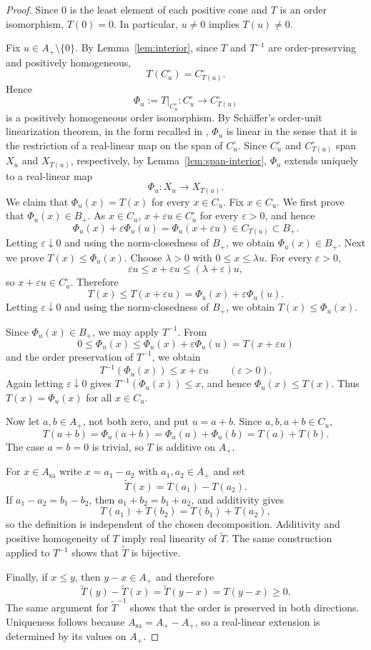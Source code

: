\documentclass[10pt,a4paper]{amsart}
\newcommand{\sa}{\mathrm{sa}}
\begin{document}
\begin{proof}
Since $0$ is the least element of each positive cone and $T$ is an
order isomorphism, $T(0)=0$.  In particular, $u\ne0$ implies
$T(u)\ne0$.

Fix $u\in A_+\setminus\{0\}$.  By Lemma~\ref{lem:interior}, since $T$ and $T^{-1}$ are 
order-preserving and positively homogeneous, 
\[
 T(C_u^\circ)=C_{T(u)}^\circ.
\]
Hence
\[
 \Phi_u:=T|_{C_u^\circ}:C_u^\circ\longrightarrow C_{T(u)}^\circ
\]
is a positively homogeneous order isomorphism.  By Sch\"affer's
order-unit linearization theorem, in the form recalled in
\cite[Theorem~5.2]{LGI}, $\Phi_u$ is linear in the sense that it is the
restriction of a real-linear map on the span of $C_u^\circ$.  Since
$C_u^\circ$ and $C_{T(u)}^\circ$ span $X_u$ and $X_{T(u)}$, respectively,
by Lemma~\ref{lem:span-interior}, $\Phi_u$ extends uniquely to a
real-linear map
\[
 \Phi_u:X_u\longrightarrow X_{T(u)}.
\]
We claim that $\Phi_u(x)=T(x)$ for every $x\in C_u$.  
Fix $x\in C_u$.  We first prove that $\Phi_u(x)\in B_+$. As $x\in C_u$, $x+\varepsilon u\in C_u^\circ$ for every $\varepsilon>0$, and hence
\[
        \Phi_u(x)+\varepsilon\Phi_u(u)
        =\Phi_u(x+\varepsilon u)\in C_{T(u)}\subset B_+.
\]
Letting $\varepsilon\downarrow0$ and using the norm-closedness of $B_{+}$, we obtain $\Phi_u(x)\in B_+$. 
Next we prove $T(x)\le \Phi_u(x)$. 
Choose $\lambda>0$ with $0\le x\le\lambda u$.  For every
$\varepsilon>0$,
\[
 \varepsilon u\le x+\varepsilon u
 \le(\lambda+\varepsilon)u,
\]
so $x+\varepsilon u\in C_u^\circ$.  Therefore
\[
 T(x)\le T(x+\varepsilon u)
 =\Phi_u(x)+\varepsilon\Phi_u(u).
\]
Letting $\varepsilon\downarrow0$ and using the norm-closedness of $B_{+}$, we obtain 
$T(x)\le\Phi_u(x)$.


Since $\Phi_u(x)\in B_+$, we may apply $T^{-1}$.
From
\[
    0\le\Phi_u(x)
    \leq\Phi_u(x)+\varepsilon\Phi_u(u)
    =T(x+\varepsilon u)
\]
and the order preservation of $T^{-1}$, we obtain
\[
    T^{-1}(\Phi_u(x))\leq x+\varepsilon u
    \qquad(\varepsilon>0).
\]
Again letting $\varepsilon\downarrow0$ gives
$T^{-1}(\Phi_u(x))\le x$, and hence $\Phi_u(x)\le T(x)$.  Thus $T(x)=\Phi_u(x)$ for all $x\in C_u$.

Now let $a,b\in A_+$, not both zero, and put $u=a+b$.  Since
$a,b,a+b\in C_u$,
\[
 T(a+b)=\Phi_u(a+b)=\Phi_u(a)+\Phi_u(b)=T(a)+T(b).
\]
The case $a=b=0$ is trivial, so $T$ is additive on $A_+$.

For $x\in A_{\sa}$ write $x=a_1-a_2$ with $a_1,a_2\in A_+$ and set
\[
 \widetilde T(x)=T(a_1)-T(a_2).
\]
If $a_1-a_2=b_1-b_2$, then $a_1+b_2=b_1+a_2$, and additivity gives
\[
 T(a_1)+T(b_2)=T(b_1)+T(a_2),
\]
so the definition is independent of the chosen decomposition.
Additivity and positive homogeneity of $T$ imply real linearity of
$\widetilde T$.  The same construction applied to $T^{-1}$ shows that
$\widetilde T$ is bijective.

Finally, if $x\le y$, then $y-x\in A_+$ and therefore
\[
 \widetilde T(y)-\widetilde T(x)
 =\widetilde T(y-x)=T(y-x)\ge0.
\]
The same argument for $\widetilde T^{-1}$ shows that the order is
preserved in both directions.  Uniqueness follows because
$A_{\sa}=A_+-A_+$, so a real-linear extension is determined by its
values on $A_+$.
\end{proof}
\end{document}
